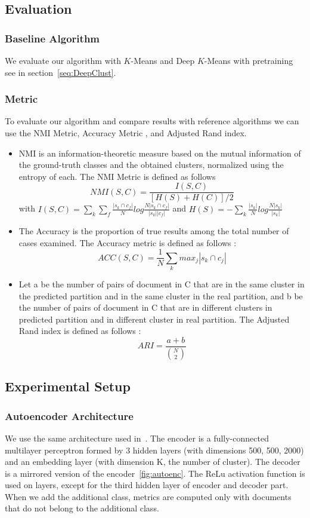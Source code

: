 \subsection{Evaluation}
\subsubsection{Baseline Algorithm}
We evaluate our algorithm with $K$-Means and Deep $K$-Means with pretraining 
see in section~\ref{seq:DeepClust}.
\subsubsection{Metric}
To evaluate our algorithm and compare results with reference algorithms we can
use the NMI Metric, Accuracy Metric \cite{NMI_ACC}, and Adjusted
Rand index\cite{ARI}. 
\begin{itemize}
\item NMI is an information-theoretic measure based on the mutual information of the ground-truth classes
and the obtained clusters, normalized using the entropy of each. The NMI Metric is defined as follows
$$NMI(S,C) = \frac{I(S,C)}{[H(S)+H(C)]/2}$$ 
with
$I(S,C) =\sum\limits_k \sum\limits_f\frac{|s_k \cap c_f|}{N}log\frac{N|s_k \cap c_f|}{|s_k| |c_f|}$
and
$H(S) = -\sum\limits_k\frac{|s_k|}{N}log\frac{N|s_k|}{|s_k|}$
\item The Accuracy is the proportion of true results among the total
  number of cases examined. The Accuracy metric is defined as follows :
$$
ACC(S,C) = \frac{1}{N}\sum\limits_k {max}_j|s_k \cap c_j|
$$
\item Let a be the number of pairs of document in C
  that are in the same cluster in the predicted partition and in the
  same cluster in the real partition, and b be the number of pairs of
  document in C that are in different clusters in predicted partition
  and in different cluster in real partition.
  The Adjusted Rand index is defined as follows :
  $$ARI = \frac{a+b}{\binom{N}{2}}$$
\end{itemize}
\subsection{Experimental Setup}
\subsubsection{Autoencoder Architecture}
We use the same architecture used in~\cite{Deap-K-Means}. The encoder is a fully-connected 
multilayer perceptron formed by 3 hidden layers (with dimensions 500, 500, 2000) 
and an embedding layer (with dimension K, the number of cluster). 
The decoder is a mirrored version of the encoder~\ref{fig:autoenc}.
The ReLu activation function is used on layers, except for the third
hidden layer of encoder and decoder part.
\\When we add the additional class, metrics are computed only with
documents that do not belong to the additional class.
